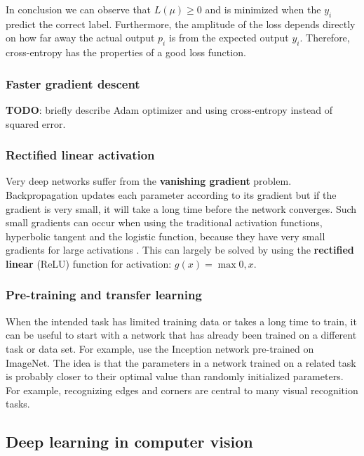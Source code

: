 In conclusion we can observe that $L(\mu) \geq 0$ and is minimized when the $y_i$ predict the correct label. Furthermore, the amplitude of the loss depends directly on how far away the actual output $p_i$ is from the expected output $y_i$. Therefore, cross-entropy has the properties of a good loss function.

\subsubsection{Faster gradient descent}
\textbf{TODO}: briefly describe Adam optimizer and using cross-entropy instead of squared error.

\subsubsection{Rectified linear activation}

Very deep networks suffer from the \textbf{vanishing gradient} problem.
Backpropagation updates each parameter according to its gradient but if the gradient is very small, it will take a long time before the network converges.
Such small gradients can occur when using the traditional activation functions, hyperbolic tangent and the logistic function, because they have very small gradients for large activations \cite{AlexNet}.
This can largely be solved by using the \textbf{rectified linear} (ReLU) function for activation: $g(x) = \max{0, x}$.


\subsubsection{Pre-training and transfer learning}

When the intended task has limited training data or takes a long time to train, it can be useful to start with a network that has already been trained on a different task or data set.
For example, \cite{SpatialTransformerNetworks} use the Inception network pre-trained on ImageNet.
The idea is that the parameters in a network trained on a related task is probably closer to their optimal value than randomly initialized parameters. For example, recognizing edges and corners are central to many visual recognition tasks.


\subsection{Deep learning in computer vision}

